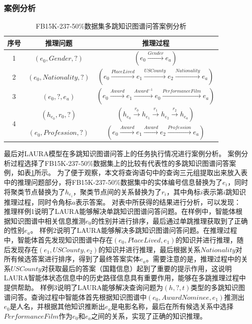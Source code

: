 \documentclass[algorithmlist, AutoFakeBold, AutoFakeSlant, figurelist, tablelist, nomlist, engineering]{seuthesix}
\begin{document}
\subsubsection{案例分析}
\begin{table}[t]
  \centering
  \caption{FB15K-237-50\%数据集多跳知识图谱问答案例分析}
  \begin{tabular*}{0.95\textwidth}{@{\extracolsep{\fill}}ccc}
    \toprule[1pt] 
    序号 & 推理问题 & 推理过程 \\ \hline
    1 & $(e_0, Gender, ?)$ & $(e_0 \xrightarrow{Gender} e_a)$ \\
    2 & $(e_0, Nationality, ?)$ & $(e_0 \xrightarrow{PlaceLived} e_1 \xrightarrow{USCounty} e_2 \xrightarrow{Nationality} e_a)$ \\
    3 & $(e_0, ?, e_a)$ & $(e_0 \xrightarrow{Award} e_1 \xrightarrow{Award^{-1}} e_0 \xrightarrow{PerformanceFilm} e_a) $ \\
    \multirow{2}{*}{4} & $(h_{e_0}, r_0, ?)$ & $(h_{e_0} \xrightarrow{r_0} h_{e_1} \xrightarrow{r_1} h_{e_2} \xrightarrow{r_2} h_{e_a})$ \\
    & $(e_0, Profession, ?)$ & $(e_0 \xrightarrow{Award} e_1 \xrightarrow{Award} e_2 \xrightarrow{Profession} e_a)$ \\
    \bottomrule[1pt]
  \end{tabular*}
  \label{Experiment2_CaseStudy}
\end{table}
最后对LAURA模型在多跳知识图谱问答上的任务执行情况进行案例分析。
案例分析过程选择了FB15K-237-50\%数据集上的比较有代表性的多跳知识图谱问答案例，如表\ref{Experiment2_CaseStudy}所示。
为了便于观察，本文将查询语句中的查询三元组提取出来放入表中的推理问题部分，将FB15K-237-50\%数据集中的实体编号信息替换为了$e_i$，同时将聚类节点替换为了$h_{e_i}$，聚类节点间的关系替换为了$r_i$，其中角标$i$表示第$i$跳知识推理过程，同时令角标$a$表示答案。
对表中所获得的结果进行分析，可以发现：
推理样例1说明了LAURA能够解决单跳知识图谱问答问题。在样例中，智能体根据知识图谱中相关信息推测$e_0$的性别并进行排序，最后通过单跳推理获取到了正确的性别$e_a$。
样例2说明了LAURA能够解决多跳知识图谱问答问题。在推理过程中，智能体首先发现知识图谱中存在$(e_0, PlaceLived, e_1)$的知识并进行推理，随后发现存在$(e_1, USCounty, e_2)$的知识并进行推理，最后根据关系$Nationality$对所有候选答案进行排序，得到了最终答案实体$e_a$。需要注意的是，推理过程中的关系$USCounty$对获取最后的答案（国籍信息）起到了重要的提示作用，这说明LAURA智能体状态信息中的历史路径信息具有重要作用，能够在多跳推理过程中提供帮助。
样例3说明了LAURA能够解决查询问题为$(h, ?, t)$类型的多跳知识图谱问答。查询过程中智能体首先根据知识图谱中$(e_0, AwardNominee, e_1)$推测出$e_0$是人名，并根据其他知识推断出$e_a$是电影名称，最后在所有候选关系中选择$PerformanceFilm$作为$e_0$和$e_a$之间的关系，实现了正确的知识推理。
\end{document}
